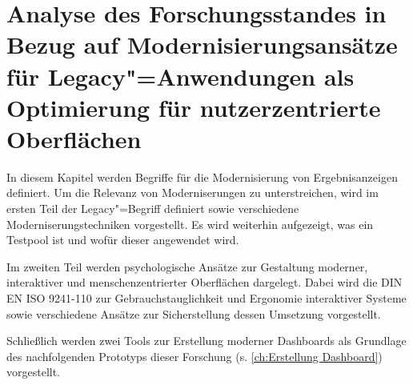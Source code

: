 \chapter{Analyse des Forschungsstandes in Bezug auf Modernisierungsansätze für Legacy"=Anwendungen als Optimierung für nutzerzentrierte Oberflächen}
\label{ch:Stand der Forschung}

In diesem Kapitel werden Begriffe für die Modernisierung von Ergebnisanzeigen definiert.
Um die Relevanz von Moderniserungen zu unterstreichen, wird im ersten Teil der Legacy"=Begriff definiert sowie verschiedene Moderniserungstechniken vorgestellt. Es wird weiterhin aufgezeigt, was ein Testpool ist und wofür dieser angewendet wird.

Im zweiten Teil werden psychologische Ansätze zur Gestaltung moderner, interaktiver und menschenzentrierter Oberflächen dargelegt. Dabei wird die DIN EN ISO 9241-110 zur Gebrauchstauglichkeit und Ergonomie interaktiver Systeme sowie verschiedene Ansätze zur Sicherstellung dessen Umsetzung vorgestellt.

Schließlich werden zwei Tools zur Erstellung moderner Dash\-boards als Grundlage des nachfolgenden Prototyps dieser Forschung (s. \autoref{ch:Erstellung Dashboard}) vorgestellt.

%





